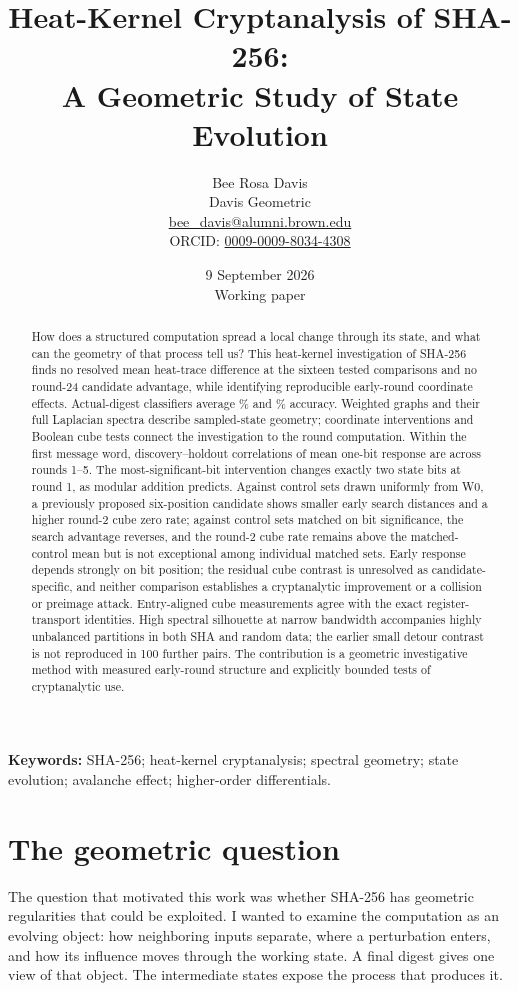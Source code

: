 \documentclass[11pt]{article}
\title{Heat-Kernel Cryptanalysis of SHA-256:\\A Geometric Study of State Evolution}
\author{Bee Rosa Davis\\Davis Geometric\\\small \href{mailto:bee_davis@alumni.brown.edu}{bee\_davis@alumni.brown.edu}\\\small ORCID: \href{https://orcid.org/0009-0009-8034-4308}{0009-0009-8034-4308}}
\date{9 September 2026\\\small Working paper}
\begin{document}
\maketitle
\begin{abstract}
How does a structured computation spread a local change through its state, and what can the geometry of that process tell us? This heat-kernel investigation of SHA-256 finds no resolved mean heat-trace difference at the sixteen tested comparisons and no round-24 candidate advantage, while identifying reproducible early-round coordinate effects. Actual-digest classifiers average \RFAccuracy\% and \SVMAccuracy\% accuracy. Weighted graphs and their full Laplacian spectra describe sampled-state geometry; coordinate interventions and Boolean cube tests connect the investigation to the round computation. Within the first message word, discovery--holdout correlations of mean one-bit response are \EarlyCorrRange{} across rounds 1--5. The most-significant-bit intervention changes exactly two state bits at round 1, as modular addition predicts. Against control sets drawn uniformly from W0, a previously proposed six-position candidate shows smaller early search distances and a higher round-2 cube zero rate; against control sets matched on bit significance, the search advantage reverses, and the round-2 cube rate remains above the matched-control mean but is not exceptional among individual matched sets. Early response depends strongly on bit position; the residual cube contrast is unresolved as candidate-specific, and neither comparison establishes a cryptanalytic improvement or a collision or preimage attack. Entry-aligned cube measurements agree with the exact register-transport identities. High spectral silhouette at narrow bandwidth accompanies highly unbalanced partitions in both SHA and random data; the earlier small detour contrast is not reproduced in 100 further pairs. The contribution is a geometric investigative method with measured early-round structure and explicitly bounded tests of cryptanalytic use.
\end{abstract}
\noindent\textbf{Keywords:} SHA-256; heat-kernel cryptanalysis; spectral geometry; state evolution; avalanche effect; higher-order differentials.

\section{The geometric question}
The question that motivated this work was whether SHA-256 has geometric regularities that could be exploited. I wanted to examine the computation as an evolving object: how neighboring inputs separate, where a perturbation enters, and how its influence moves through the working state. A final digest gives one view of that object. The intermediate states expose the process that produces it.
\end{document}
